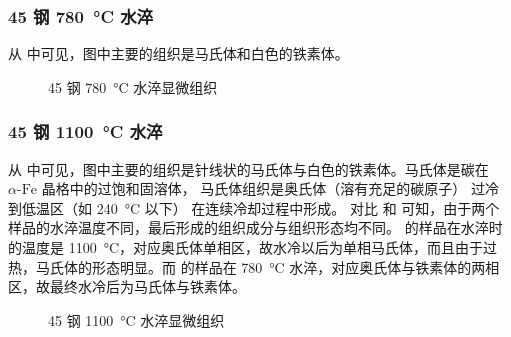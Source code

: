     \subsubsection{45 钢 \SI{780}{\degreeCelsius} 水淬\label{ss2:45_780}}
    从 中可见，图中主要的组织是马氏体和白色的铁素体。
    \begin{figure}[!ht]
        \hspace{20pt}
        \caption{45 钢 \SI{780}{\degreeCelsius} 水淬显微组织\label{fig:n10}}
    \end{figure}

    \subsubsection{45 钢 \SI{1100}{\degreeCelsius} 水淬\label{ss2:45_1100}}
    从 中可见，图中主要的组织是针线状的马氏体与白色的铁素体。马氏体是碳在$\alpha\text{-Fe}$ 晶格中的过饱和固溶体， 马氏体组织是奥氏体（溶有充足的碳原子） 过冷到低温区（如 \SI{240}{\degreeCelsius} 以下） 在连续冷却过程中形成。
	对比  和  可知，由于两个样品的水淬温度不同，最后形成的组织成分与组织形态均不同。 的样品在水淬时的温度是 \SI{1100}{\degreeCelsius}，对应奥氏体单相区，故水冷以后为单相马氏体，而且由于过热，马氏体的形态明显。而  的样品在 \SI{780}{\degreeCelsius} 水淬，对应奥氏体与铁素体的两相区，故最终水冷后为马氏体与铁素体。

    \begin{figure}[!ht]
        \hspace{20pt}
        \caption{45 钢 \SI{1100}{\degreeCelsius} 水淬显微组织\label{fig:n11}}
    \end{figure}

